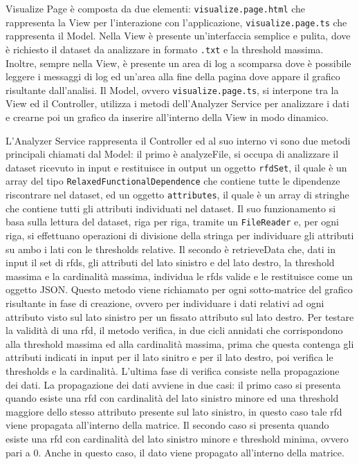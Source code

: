 Visualize Page \`{e} composta da due elementi: \texttt{visualize.page.html} che rappresenta la View per l'interazione con l'applicazione, \texttt{visualize.page.ts} che rappresenta il Model. Nella View \`{e} presente un'interfaccia semplice e pulita, dove \`{e} richiesto il dataset da analizzare in formato \texttt{.txt} e la threshold massima. Inoltre, sempre nella View, \`{e} presente un area di log a scomparsa dove \`{e} possibile leggere i messaggi di log ed un'area alla fine della pagina dove appare il grafico risultante dall'analisi. Il Model, ovvero \texttt{visualize.page.ts}, si interpone tra la View ed il Controller, utilizza i metodi dell'Analyzer Service per analizzare i dati e crearne poi un grafico da inserire all'interno della View in modo dinamico.\par
L'Analyzer Service rappresenta il Controller ed al suo interno vi sono due metodi principali chiamati dal Model: il primo \`{e} analyzeFile, si occupa di analizzare il dataset ricevuto in input e restituisce in output un oggetto \texttt{rfdSet}, il quale \`{e} un array del tipo \texttt{RelaxedFunctionalDependence} che contiene tutte le dipendenze riscontrare nel dataset, ed un oggetto \texttt{attributes}, il quale \`{e} un array di stringhe che contiene tutti gli attributi individuati nel dataset. Il suo funzionamento si basa sulla lettura del dataset, riga per riga, tramite un \texttt{FileReader} e, per ogni riga, si effettuano operazioni di divisione della stringa per individuare gli attributi su ambo i lati con le thresholds relative. Il secondo \`{e} retrieveData che, dati in input il set di \acrshort{rfds}, gli attributi del lato sinistro e del lato destro, la threshold massima e la cardinalit\`{a} massima, individua le \acrshort{rfds} valide e le restituisce come un oggetto JSON. Questo metodo viene richiamato per ogni sotto-matrice del grafico risultante in fase di creazione, ovvero per individuare i dati relativi ad ogni attributo visto sul lato sinistro per un fissato attributo sul lato destro. Per testare la validit\`{a} di una \acrshort{rfd}, il metodo verifica, in due cicli annidati che corrispondono alla threshold massima ed alla cardinalit\`{a} massima, prima che questa contenga gli attributi indicati in input per il lato sinitro e per il lato destro, poi verifica le thresholds e la cardinalit\`{a}. L'ultima fase di verifica consiste nella propagazione dei dati. La propagazione dei dati avviene in due casi: il primo caso si presenta quando esiste una \acrshort{rfd} con cardinalit\`{a} del lato sinistro minore ed una threshold maggiore dello stesso attributo presente sul lato sinistro, in questo caso tale \acrshort{rfd} viene propagata all'interno della matrice. Il secondo caso si presenta quando esiste una \acrshort{rfd} con cardinalit\`{a} del lato sinistro minore e threshold minima, ovvero pari a $0$. Anche in questo caso, il dato viene propagato all'interno della matrice.

